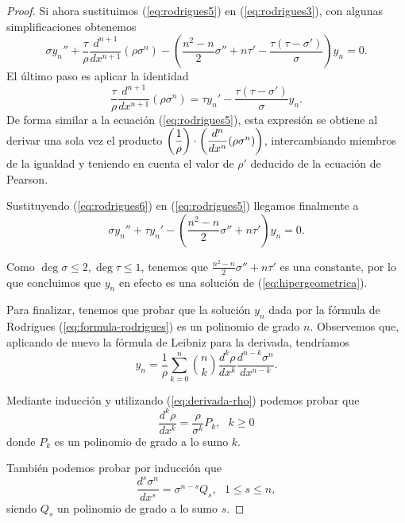 \begin{proof}
    Si ahora sustituimos (\ref{eq:rodrigues5}) en (\ref{eq:rodrigues3}), con algunas simplificaciones obtenemos
    \begin{equation}
        \sigma y_n'' + \frac{\tau}{\rho} \frac{d^{n+1}}{d x^{n+1}} \left(\rho\sigma^n \right) - \left(\frac{n^2-n}{2}\sigma''+n\tau'-\frac{\tau(\tau-\sigma')}{\sigma}  \right)y_n = 0.
    \end{equation}
    El último paso es aplicar la identidad 
    \begin{equation}
        \label{eq:rodrigues6}
        \frac{\tau}{\rho}\frac{d^{n+1}}{d x^{n+1}} \left(\rho\sigma^n \right) = \tau y_n'-\frac{\tau(\tau-\sigma')}{\sigma}y_n.
    \end{equation}
    De forma similar a la ecuación (\ref{eq:rodrigues5}), esta expresión se obtiene al derivar una sola vez el producto $\left(\dfrac 1 {\rho}\right)\cdot\nolinebreak\left(\dfrac{d^n}{dx^n} (\rho\sigma^n)\right)$, intercambiando miembros de la igualdad y teniendo en cuenta el valor de $\rho'$ deducido de la ecuación de Pearson. 

    Sustituyendo (\ref{eq:rodrigues6}) en (\ref{eq:rodrigues5}) llegamos finalmente a 
    \begin{equation}
        \sigma y_n'' + \tau y_n' - \left(\frac{n^2-n}{2}\sigma'' + n\tau' \right)y_n =0.
    \end{equation}
    
    Como $\deg\sigma\leq 2,  \deg\tau\leq 1$, tenemos que $\frac{n^2-n}{2}\sigma'' + n\tau'$ es una constante, por lo que concluimos que $y_n$ en efecto es una solución de (\ref{eq:hipergeometrica}).
    
    Para finalizar, tenemos que probar que la solución $y_n$ dada por la fórmula de Rodrigues (\ref{eq:formula-rodrigues}) es un polinomio de grado $n$. Observemos que, aplicando de nuevo la fórmula de Leibniz para la derivada, tendríamos
    \begin{equation}
        \label{eq:leibniz-rodrigues}
        y_n = \frac 1 \rho \sum_{k=0}^n \binom{n}{k} \frac{d^k \rho}{d x^k} \frac{d^{n-k} \sigma^n}{d x^{n-k}}.
    \end{equation}

    Mediante inducción y utilizando (\ref{eq:derivada-rho}) podemos probar que
    $$
    \frac{d^k \rho}{d x^k} = \dfrac\rho{\sigma^k} P_k, \ \ \ k\geq 0
    $$
    donde $P_k$ es un polinomio de grado a lo sumo $k$. 

    También podemos probar por inducción que
    $$
    \frac{d^s \sigma^n}{d x^s} = \sigma^{n-s} Q_s, \ \ \ 1\leq s \leq n,
    $$
    siendo $Q_s$ un polinomio de grado a lo sumo $s$. 


\end{proof}
